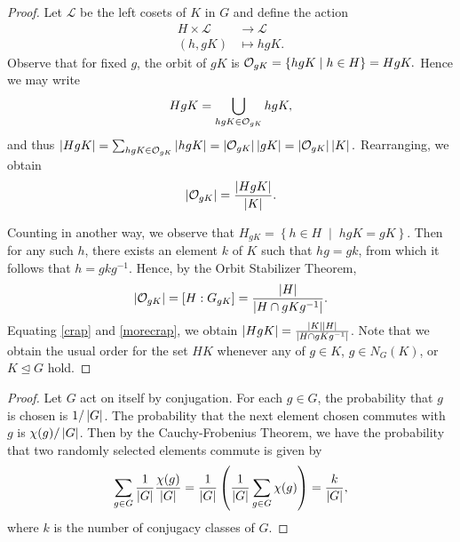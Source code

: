 \documentclass[10pt]{amsart}
\begin{document}
\begin{thm}
  \begin{proof}
    Let $\mathcal{L}$ be the left cosets of $K$ in $G$ and define the action
    \begin{align*}
      H \times \mathcal{L} &\rightarrow \mathcal{L}\\
      (h,gK) &\mapsto hgK.
    \end{align*}
    Observe that for fixed $g$, the orbit of $gK$ is $\mathcal{O}_{gK} = \left\{hgK \;\middle\vert\; h \in H\right\} = HgK.$
    Hence we may write $$HgK = \bigcup_{hgK \in \mathcal{O}_{gK}} hgK,$$
    and thus $\left| HgK \right| = \sum_{hgK \in \mathcal{O}_{gK}} \left| hgK \right| = \left| \mathcal{O}_{gK} \right|\left| gK \right| = \left| \mathcal{O}_{gK} \right|\left| K \right|.$
    Rearranging, we obtain 
    \begin{equation}\label{crap}
          \left| \mathcal{O}_{gK} \right| = \frac{\left| HgK \right|}{\left| K \right|}.
    \end{equation}
    
    Counting in another way, we observe that $H_{gK} = \left\{h \in H \;\middle\vert\; hgK = gK\right\}$.
    Then for any such $h$, there exists an element $k$ of $K$ such that $hg = gk$, from which it follows that $h = gkg^{-1}$.
    Hence, by the Orbit Stabilizer Theorem, 
    \begin{equation}\label{morecrap}
      \left| \mathcal{O}_{gK} \right| = [H : G_{gK}] = \frac{\left| H \right|}{\left| H \cap gKg^{-1} \right|}.
    \end{equation}
    Equating \eqref{crap} and \eqref{morecrap}, we obtain $\left| HgK \right| = \frac{\left| K \right|\left| H \right|}{\left| H \cap gKg^{-1} \right|}$.
    Note that we obtain the usual order for the set $HK$ whenever any of $g \in K$, $g \in N_G(K)$, or $K \unlhd G$ hold.
  \end{proof}
\end{thm}

\begin{thm}
  \begin{proof}
    Let $G$ act on itself by conjugation.
    For each $g \in G$, the probability that $g$ is chosen is $1/\left| G \right|$.
    The probability that the next element chosen commutes with $g$ is $\chi(g)/\left| G \right|$.
    Then by the Cauchy-Frobenius Theorem, we have the probability that two randomly selected elements commute is given by 
    $$\sum_{g \in G} \frac{1}{\left| G \right|} \frac{\chi(g)}{\left| G \right|} = \frac{1}{\left| G \right|} \left(\frac{1}{\left| G \right|} \sum_{g \in G} \chi(g) \right) = \frac{k}{\left| G \right|},$$
    where $k$ is the number of conjugacy classes of $G$.
  \end{proof}
\end{thm}
\end{document}
